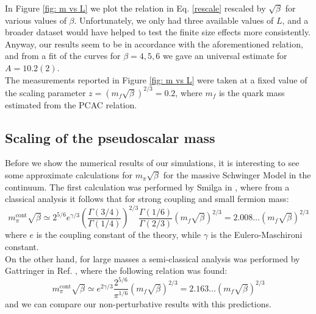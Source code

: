 In Figure \eqref{fig: m vs L} we plot the relation in Eq. \eqref{rescale} rescaled by $\sqrt{\beta}$ for various values of $\beta$. Unfortunately, we only had three available values of $L$, and a broader dataset would have helped to test the finite size effects more consistently. Anyway, our results seem to be in accordance with the aforementioned relation, and from a fit of the curves for $\beta = 4, 5, 6$ we gave an universal estimate for $A = 10.2(2)$.
\\ The measurements reported in Figure \eqref{fig: m vs L} were taken at a fixed value of the scaling parameter $z = (m_f \sqrt{\beta})^{2/3} = 0.2$, where $m_f$ is the quark mass estimated from the PCAC relation. 

\subsection{Scaling of the pseudoscalar mass}
Before we show the numerical results of our simulations, it is interesting to see some approximate calculations for $m_\pi \sqrt{\beta}$ for the massive Schwinger Model in the continuum. The first calculation was performed by Smilga in \cite{PhysRevD.55.R443}, where from a classical analysis it follows that for strong coupling and small fermion mass:
\begin{equation}\label{Smilga}
    m_\pi^{\textrm{cont}}\sqrt{\beta} \simeq 2^{5/6} e^{\gamma/3} \left(\frac{\Gamma(3/4)}{\Gamma(1/4)}\right)^{2/3} \frac{\Gamma(1/6)}{\Gamma(2/3)} (m_f \sqrt{\beta})^{2/3} = 2.008\dots (m_f \sqrt{\beta})^{2/3}
\end{equation}
where $e$ is the coupling constant of the theory, while $\gamma$ is the Eulero-Maschironi constant.
\\ On the other hand, for large masses a semi-classical analysis was performed by Gattringer in Ref. \cite{https://doi.org/10.48550/arxiv.hep-th/9503137}, where the following relation was found:
\begin{equation}\label{Gatt Cont}
     m_\pi^{\textrm{cont}}\sqrt{\beta} \simeq e^{2\gamma/3} \frac{2^{5/6}}{\pi^{1/6}} \left(m_f \sqrt{\beta}\right)^{2/3} = 2.163\dots(m_f \sqrt{\beta})^{2/3}
\end{equation}
and we can compare our non-perturbative results with this predictions.
